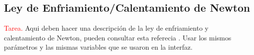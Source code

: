 \documentclass[12pt,letterpaper]{article}
\begin{document}
\subsection{Ley de Enfriamiento/Calentamiento de Newton}
\textcolor{red}{Tarea.} Aqui deben hacer una descripción de la ley de enfriamiento y calentamiento de Newton, pueden consultar esta referecia \cite[Capitulo 3]{librozill}. Usar los mismos parámetros y las mismas variables que se usaron en la interfaz.



\end{document}
